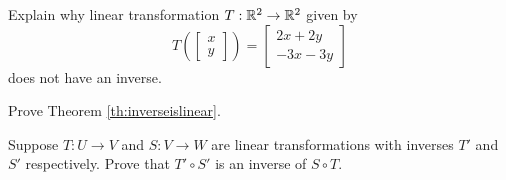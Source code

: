 \documentclass{ximera}
\begin{document}
\begin{problem}Explain why linear transformation $T:\mathbb{R}^2\rightarrow\mathbb{R}^2$ given by $$T\left(\begin{bmatrix}x\\y\end{bmatrix}\right)=\begin{bmatrix}2x+2y\\-3x-3y\end{bmatrix}$$ does not have an inverse.
\end{problem}
\begin{problem}\label{prob:inverseislinear}
Prove Theorem \ref{th:inverseislinear}.  
\end{problem}
\begin{problem} Suppose $T:U\rightarrow V$ and $S:V\rightarrow W$ are linear transformations with inverses $T'$ and $S'$ respectively.  Prove that $T'\circ S'$ is an inverse of $S\circ T$.
\end{problem}
\end{document}
